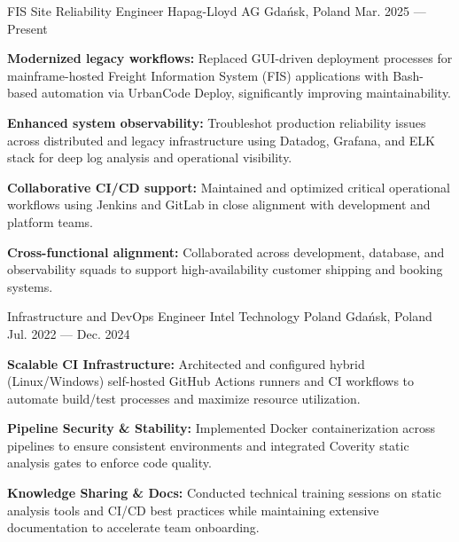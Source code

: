 
\begin{cventries}

    \cventry
    {FIS Site Reliability Engineer} %
    {Hapag-Lloyd AG} %
    {Gdańsk, Poland} %
    {Mar. 2025 --- Present} %
    {
        \begin{cvitems} %
        \item \textbf{Modernized legacy workflows:} Replaced GUI-driven deployment processes for mainframe-hosted Freight Information System (FIS) applications with Bash-based automation via UrbanCode Deploy, significantly improving maintainability.
        \item \textbf{Enhanced system observability:} Troubleshot production reliability issues across distributed and legacy infrastructure using Datadog, Grafana, and ELK stack for deep log analysis and operational visibility.
        \item \textbf{Collaborative CI/CD support:} Maintained and optimized critical operational workflows using Jenkins and GitLab in close alignment with development and platform teams.
        \item \textbf{Cross-functional alignment:} Collaborated across development, database, and observability squads to support high-availability customer shipping and booking systems.  
        \end{cvitems}
    }

    \cventry
    {Infrastructure and DevOps Engineer} %
    {Intel Technology Poland} %
    {Gdańsk, Poland} %
    {Jul. 2022 --- Dec. 2024} %
    {
        \begin{cvitems} %
        \item \textbf{Scalable CI Infrastructure:} Architected and configured hybrid (Linux/Windows) self-hosted GitHub Actions runners and CI workflows to automate build/test processes and maximize resource utilization.
        \item \textbf{Pipeline Security \& Stability:} Implemented Docker containerization across pipelines to ensure consistent environments and integrated Coverity static analysis gates to enforce code quality.
        \item \textbf{Knowledge Sharing \&  Docs:} Conducted technical training sessions on static analysis tools and CI/CD best practices while maintaining extensive documentation to accelerate team onboarding.   
        \end{cvitems}
    }


\end{cventries}
